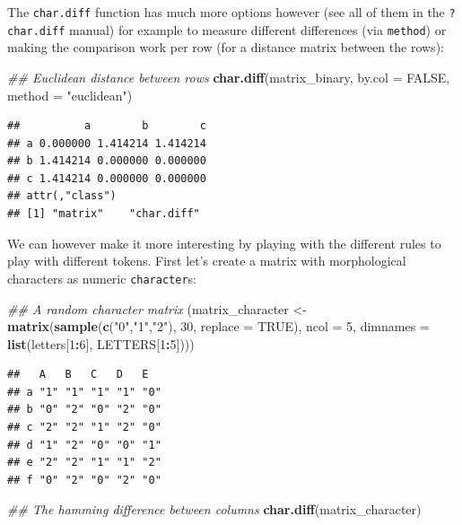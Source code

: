 \documentclass[
]{book}
\newenvironment{Shaded}{\begin{snugshade}}{\end{snugshade}}
\newcommand{\CommentTok}[1]{\textcolor[rgb]{0.56,0.35,0.01}{\textit{#1}}}
\newcommand{\DataTypeTok}[1]{\textcolor[rgb]{0.13,0.29,0.53}{#1}}
\newcommand{\DecValTok}[1]{\textcolor[rgb]{0.00,0.00,0.81}{#1}}
\newcommand{\KeywordTok}[1]{\textcolor[rgb]{0.13,0.29,0.53}{\textbf{#1}}}
\newcommand{\NormalTok}[1]{#1}
\newcommand{\OperatorTok}[1]{\textcolor[rgb]{0.81,0.36,0.00}{\textbf{#1}}}
\newcommand{\OtherTok}[1]{\textcolor[rgb]{0.56,0.35,0.01}{#1}}
\newcommand{\StringTok}[1]{\textcolor[rgb]{0.31,0.60,0.02}{#1}}
\begin{document}
The \texttt{char.diff} function has much more options however (see all of them in the \texttt{?char.diff} manual) for example to measure different differences (via \texttt{method}) or making the comparison work per row (for a distance matrix between the rows):

\begin{Shaded}
\begin{Highlighting}[]
\CommentTok{\#\# Euclidean distance between rows}
\KeywordTok{char.diff}\NormalTok{(matrix\_binary, }\DataTypeTok{by.col =} \OtherTok{FALSE}\NormalTok{, }\DataTypeTok{method =} \StringTok{"euclidean"}\NormalTok{)}
\end{Highlighting}
\end{Shaded}

\begin{verbatim}
##          a        b        c
## a 0.000000 1.414214 1.414214
## b 1.414214 0.000000 0.000000
## c 1.414214 0.000000 0.000000
## attr(,"class")
## [1] "matrix"    "char.diff"
\end{verbatim}

We can however make it more interesting by playing with the different rules to play with different tokens.
First let's create a matrix with morphological characters as numeric \texttt{character}s:

\begin{Shaded}
\begin{Highlighting}[]
\CommentTok{\#\# A random character matrix}
\NormalTok{(matrix\_character \textless{}{-}}\StringTok{ }\KeywordTok{matrix}\NormalTok{(}\KeywordTok{sample}\NormalTok{(}\KeywordTok{c}\NormalTok{(}\StringTok{"0"}\NormalTok{,}\StringTok{"1"}\NormalTok{,}\StringTok{"2"}\NormalTok{), }\DecValTok{30}\NormalTok{, }\DataTypeTok{replace =} \OtherTok{TRUE}\NormalTok{), }\DataTypeTok{ncol =} \DecValTok{5}\NormalTok{,}
                           \DataTypeTok{dimnames =} \KeywordTok{list}\NormalTok{(letters[}\DecValTok{1}\OperatorTok{:}\DecValTok{6}\NormalTok{], LETTERS[}\DecValTok{1}\OperatorTok{:}\DecValTok{5}\NormalTok{])))}
\end{Highlighting}
\end{Shaded}

\begin{verbatim}
##   A   B   C   D   E  
## a "1" "1" "1" "1" "0"
## b "0" "2" "0" "2" "0"
## c "2" "2" "1" "2" "0"
## d "1" "2" "0" "0" "1"
## e "2" "2" "1" "1" "2"
## f "0" "2" "0" "2" "0"
\end{verbatim}

\begin{Shaded}
\begin{Highlighting}[]
\CommentTok{\#\# The hamming difference between columns}
\KeywordTok{char.diff}\NormalTok{(matrix\_character)}
\end{Highlighting}
\end{Shaded}
\end{document}
